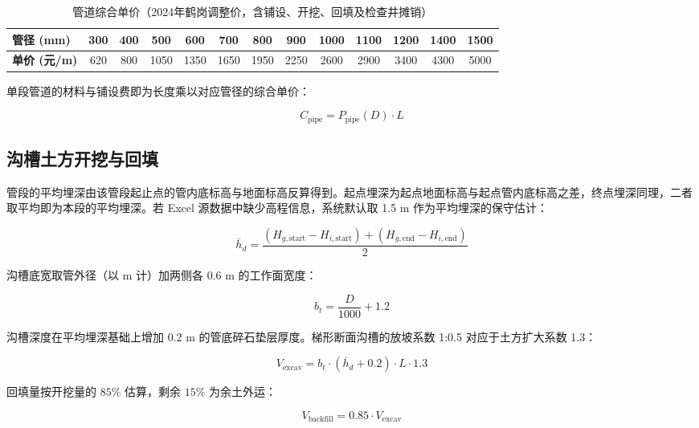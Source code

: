 \documentclass[12pt,a4paper]{ctexart}
\begin{document}
\begin{table}[htbp]
\centering
\caption{管道综合单价（2024年鹤岗调整价，含铺设、开挖、回填及检查井摊销）}
\label{tab:pipe_price}
\begin{tabular}{lcccccccccccc}
\toprule
\textbf{管径 (mm)} & 300 & 400 & 500 & 600 & 700 & 800 & 900 & 1000 & 1100 & 1200 & 1400 & 1500 \\
\midrule
\textbf{单价 (元/m)} & 620 & 800 & 1050 & 1350 & 1650 & 1950 & 2250 & 2600 & 2900 & 3400 & 4300 & 5000 \\
\bottomrule
\end{tabular}
\end{table}

单段管道的材料与铺设费即为长度乘以对应管径的综合单价：

\begin{equation}
C_{\text{pipe}} = P_{\text{pipe}}(D) \cdot L
\end{equation}

\subsection{沟槽土方开挖与回填}

管段的平均埋深由该管段起止点的管内底标高与地面标高反算得到。起点埋深为起点地面标高与起点管内底标高之差，终点埋深同理，二者取平均即为本段的平均埋深。若 Excel 源数据中缺少高程信息，系统默认取 1.5 m 作为平均埋深的保守估计：

\begin{equation}
\overline{h}_d = \frac{(H_{g,\text{start}} - H_{i,\text{start}}) + (H_{g,\text{end}} - H_{i,\text{end}})}{2}
\end{equation}

沟槽底宽取管外径（以 m 计）加两侧各 0.6 m 的工作面宽度：

\begin{equation}
b_t = \frac{D}{1000} + 1.2
\end{equation}

沟槽深度在平均埋深基础上增加 0.2 m 的管底碎石垫层厚度。梯形断面沟槽的放坡系数 1:0.5 对应于土方扩大系数 1.3：

\begin{equation}
V_{\text{excav}} = b_t \cdot (\overline{h}_d + 0.2) \cdot L \cdot 1.3
\end{equation}

回填量按开挖量的 $85\%$ 估算，剩余 $15\%$ 为余土外运：

\begin{equation}
V_{\text{backfill}} = 0.85 \cdot V_{\text{excav}}
\end{equation}
\end{document}
